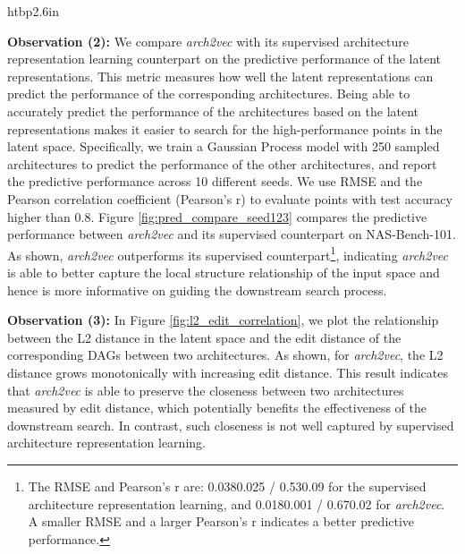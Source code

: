 \begin{wrapfigure}{htbp}{2.6in}
\begin{minipage}{2.6in}
\vspace{-7mm}
\vspace{-6mm}
\caption{{\footnotesize Predictive performance comparison between \textit{arch2vec} (left) and supervised architecture representation learning (right) on NAS-Bench-101.}}
\vspace{-3mm}
\label{fig:pred_compare_seed123}
\end{minipage}
\end{wrapfigure}
\textbf{Observation (2):} 
We compare \textit{arch2vec} with its supervised architecture representation learning counterpart on the predictive performance of the latent representations. This metric measures how well the latent representations can predict the performance of the corresponding architectures.
Being able to accurately predict the performance of the architectures based on the latent representations makes it easier to search for the high-performance points in the latent space. 
Specifically, we train a Gaussian Process model with 250 sampled architectures to predict the performance of the other architectures, and report the predictive performance across 10 different seeds. We use RMSE and the Pearson correlation coefficient (Pearson's r) to evaluate points with test accuracy higher than 0.8. 
Figure \ref{fig:pred_compare_seed123} compares the predictive performance between \textit{arch2vec} and its supervised counterpart on NAS-Bench-101. 
As shown, \textit{arch2vec} outperforms its supervised counterpart\footnote{The RMSE and Pearson's r are: 0.0380.025 / 0.530.09 for the supervised architecture representation learning, and 0.0180.001 / 0.670.02 for \textit{arch2vec}. A smaller RMSE and a larger Pearson’s r indicates a better predictive performance.}, indicating \textit{arch2vec} is able to better capture the local structure relationship of the input space and hence is more informative on guiding the downstream search process.












\textbf{Observation (3):} In Figure \ref{fig:l2_edit_correlation}, we plot the relationship between the L2 distance in the latent space and the edit distance of the corresponding DAGs between two architectures. As shown, for \textit{arch2vec}, the L2 distance grows monotonically with increasing edit distance. This result indicates that \textit{arch2vec} is able to preserve the closeness between two architectures measured by edit distance, which potentially benefits the effectiveness of the downstream search. In contrast, such closeness is not well captured by supervised architecture representation learning.






